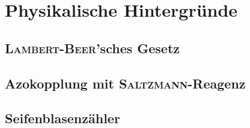 \section{Physikalische Hintergründe}
\label{sec:physik}

\subsection*{\textsc{Lambert-Beer}'sches Gesetz}

\subsection*{Azokopplung mit \textsc{Saltzmann}-Reagenz}

\subsection*{Seifenblasenzähler}